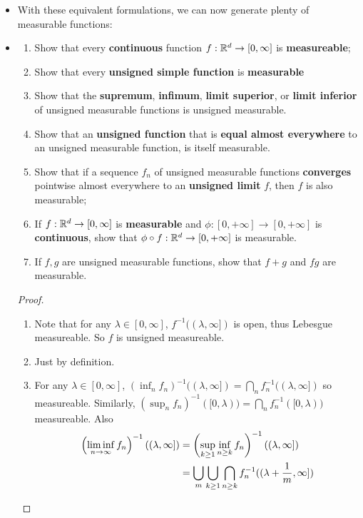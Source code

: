 \documentclass[11pt]{article}
\begin{document}
\begin{itemize}
\item With these equivalent formulations, we can now generate plenty of measurable functions:
\item \begin{exercise}
\begin{enumerate}
\item Show that every \textbf{continuous} function $f: {\mathbb R}^{d} \rightarrow [0,\infty]$ is \textbf{measureable};
\item Show that every \textbf{unsigned simple function} is \textbf{measurable}
\item Show that the \textbf{supremum}, \textbf{infimum}, \textbf{limit superior}, or \textbf{limit inferior} of unsigned measurable functions is unsigned measurable.
\item Show that an \textbf{unsigned function} that is \textbf{equal almost everywhere} to an unsigned measurable function, is itself measurable.
\item Show that if a sequence $f_n$ of unsigned measurable functions \textbf{converges} pointwise almost everywhere to an \textbf{unsigned limit} $f$, then $f$ is also measurable;
\item If $f: {\mathbb R}^{d} \rightarrow [0,\infty]$ is \textbf{measurable} and $\phi : [0,+\infty] \rightarrow [0,+\infty]$ is \textbf{continuous}, show that $\phi \circ f : {\mathbb R}^{d} \rightarrow [0,+\infty]$ is measurable.
\item If $f, g$ are unsigned measurable functions, show that $f + g$ and $fg$ are measurable.
\end{enumerate}
\end{exercise}
\begin{proof}
\begin{enumerate}
\item Note that for any $\lambda\in [0,\infty]$, $f^{-1}((\lambda,\infty])$ is open, thus Lebesgue measureable. So $f$ is unsigned measureable. 
\item Just by definition.
\item For any $\lambda\in [0,\infty]$, $(\inf_{n} f_{n})^{-1}((\lambda, \infty])= \bigcap_{n}f_{n}^{-1}((\lambda, \infty]) $ so measureable. Similarly, $(\sup_{n} f_{n})^{-1}([0,\lambda))= \bigcap_{n}f_{n}^{-1}([0,\lambda)) $ measureable. Also
\begin{align*}
\paren{\liminf\limits_{n\rightarrow\infty}f_{n}}^{-1}((\lambda, \infty])&= \paren{\sup_{k\ge 1}\inf_{n\ge k}f_{n}}^{-1}((\lambda, \infty])\\
&= \bigcup_{m}\bigcup_{k\ge 1}\bigcap_{n\ge k}f_{n}^{-1}((\lambda+\frac{1}{m}, \infty])

\end{align*}
\end{enumerate}
\end{proof}
\end{itemize}
\end{document}
